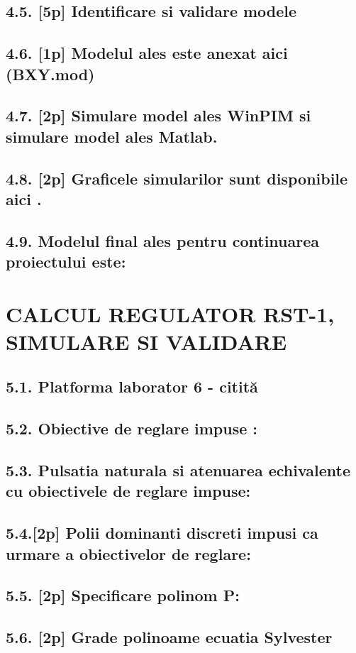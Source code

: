 \documentclass[12pt,english]{article}
\begin{document}
\subsection {4.5. [5p]  Identificare si validare modele }
\subsection {4.6. [1p] Modelul ales este anexat aici (BXY.mod) }
\subsection {4.7. [2p] Simulare model ales WinPIM si simulare model ales Matlab. }
\subsection {4.8. [2p]  Graficele simularilor sunt disponibile aici .  }
\subsection {4.9. Modelul final ales pentru continuarea proiectului este: }

\section { CALCUL REGULATOR RST-1, SIMULARE SI VALIDARE }
\subsection {5.1. Platforma laborator 6 - citită }
\subsection {5.2.  Obiective de reglare impuse  : }
\subsection {5.3. Pulsatia naturala si atenuarea echivalente cu obiectivele de reglare impuse: }
\subsection {5.4.[2p] Polii dominanti discreti impusi ca urmare a obiectivelor de reglare: }
\subsection {5.5. [2p] Specificare polinom P: }
\subsection {5.6. [2p] Grade polinoame ecuatia Sylvester }
\end{document}
